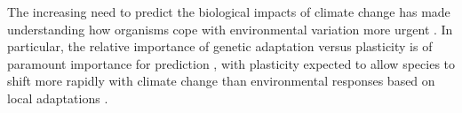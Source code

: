 \documentclass{article}
\begin{document}
The increasing need to predict the biological impacts of climate change has made understanding how organisms cope with environmental variation more urgent \citep{botero15}. In particular, the relative importance of genetic adaptation versus plasticity is of paramount importance for prediction \citep{chevin10}, with plasticity expected to allow species to shift more rapidly with climate change than environmental responses based on local adaptations \citep{chevin102, snell18}.

\end{document}
